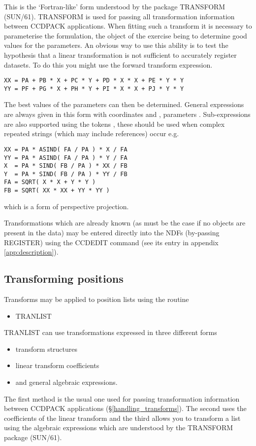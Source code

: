 This is the `Fortran-like' form understood by the package TRANSFORM
(SUN/61). TRANSFORM is used for passing all transformation information 
between CCDPACK applications. When fitting such a transform it is
necessary to parameterise the formulation, the object of the exercise
being to determine good values for the parameters. An obvious way to use
this ability is to test the hypothesis that a linear transformation is
not sufficient to accurately register datasets. To do this you might use
the forward transform expression.
\begin{myquote}
\begin{verbatim}
XX = PA + PB * X + PC * Y + PD * X * X + PE * Y * Y
YY = PF + PG * X + PH * Y + PI * X * X + PJ * Y * Y
\end{verbatim}
\end{myquote}
The best values of the  parameters can then be determined.
General expressions are always given in this form with coordinates
 and , parameters .
Sub-expressions are also supported using the tokens , these
should be used when complex repeated strings (which may include
 references) occur e.g.
\begin{myquote}
\begin{verbatim}
XX = PA * ASIND( FA / PA ) * X / FA
YY = PA * ASIND( FA / PA ) * Y / FA
X  = PA * SIND( FB / PA ) * XX / FB
Y  = PA * SIND( FB / PA ) * YY / FB
FA = SQRT( X * X + Y * Y )
FB = SQRT( XX * XX + YY * YY )
\end{verbatim}
\end{myquote}
which is a form of perspective projection.

Transformations which are already known (as must be the case if no
objects are present in the data) may be entered directly into the NDFs
(by-passing REGISTER) using the CCDEDIT command
(see its entry in appendix \ref{app:description}).

\subsection{Transforming positions}
Transforms may be applied to position lists using the routine
\begin{itemize}
\item TRANLIST
\end{itemize}
TRANLIST can use transformations expressed in three different forms
\begin{itemize}
\item transform structures
\item linear transform coefficients
\item and general algebraic expressions.
\end{itemize}
The first method is the usual one used for passing transformation
information between CCDPACK applications (\S\ref{handling_transforms}).
The second uses the coefficients of the linear transform and the third
allows you to transform a list using the algebraic expressions which are
understood by the TRANSFORM package (SUN/61).


